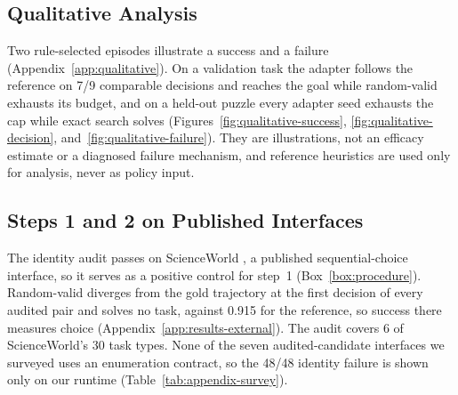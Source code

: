 \subsection{Qualitative Analysis}
\label{sec:results-qualitative}

Two rule-selected episodes illustrate a success and a failure (Appendix~\ref{app:qualitative}). On a validation task the adapter follows the reference on 7/9 comparable decisions and reaches the goal while random-valid exhausts its budget, and on a held-out puzzle every adapter seed exhausts the cap while exact search solves (Figures~\ref{fig:qualitative-success}, \ref{fig:qualitative-decision}, and~\ref{fig:qualitative-failure}). They are illustrations, not an efficacy estimate or a diagnosed failure mechanism, and reference heuristics are used only for analysis, never as policy input.


\subsection{Steps 1 and 2 on Published Interfaces}
\label{sec:results-external}

The identity audit passes on ScienceWorld \citep{wang2022scienceworld}, a published sequential-choice interface, so it serves as a positive control for step~1 (Box~\ref{box:procedure}). Random-valid diverges from the gold trajectory at the first decision of every audited pair and solves no task, against 0.915 for the reference, so success there measures choice (Appendix~\ref{app:results-external}). The audit covers 6 of ScienceWorld's 30 task types. None of the seven audited-candidate interfaces we surveyed uses an enumeration contract, so the 48/48 identity failure is shown only on our runtime (Table~\ref{tab:appendix-survey}).

